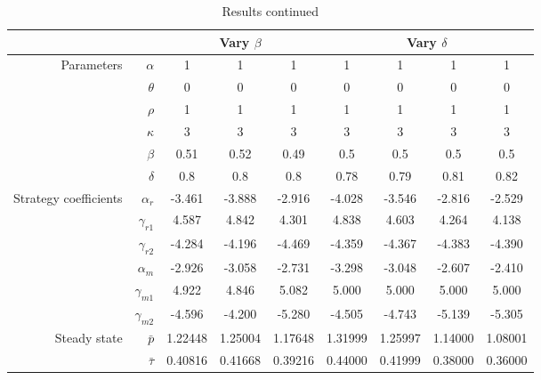 \begin{sidewaystable}[htbp]
  \centering
  \caption{Results continued}
    \begin{tabular}{|rr|ccc|cccc|}
    \hline
          &       & \multicolumn{3}{c|}{Vary $\beta$}   & \multicolumn{4}{c|}{Vary $\delta$}  \\
    \hline
    \multirow{6}[1]{*}{Parameters} & $\alpha$ & 1     & 1     & 1     & 1     & 1     & 1     & 1\\
          & $\theta$ & 0     & 0     & 0     & 0     & 0     & 0     & 0 \\
          & $\rho$ & 1     & 1     & 1     & 1     & 1     & 1     & 1 \\
          & $\kappa$ & 3     & 3     & 3     & 3     & 3     & 3     & 3 \\
          & $\beta$ & 0.51  & 0.52  & 0.49  & 0.5   & 0.5   & 0.5   & 0.5 \\
          & $\delta$ & 0.8   & 0.8   & 0.8   & 0.78  & 0.79  & 0.81  & 0.82 \\ \hline
    \multirow{6}[0]{*}{Strategy coefficients} & $\alpha_r$ & -3.461 & -3.888 & -2.916 & -4.028 & -3.546 & -2.816 & -2.529 \\
          & $\gamma_{r1}$ & 4.587 & 4.842 & 4.301 & 4.838 & 4.603 & 4.264 & 4.138 \\
          & $\gamma_{r2}$ & -4.284 & -4.196 & -4.469 & -4.359 & -4.367 & -4.383 & -4.390 \\
          & $\alpha_m$ & -2.926 & -3.058 & -2.731 & -3.298 & -3.048 & -2.607 & -2.410 \\
          & $\gamma_{m1}$ & 4.922 & 4.846 & 5.082 & 5.000 & 5.000 & 5.000 & 5.000 \\
          & $\gamma_{m2}$ & -4.596 & -4.200 & -5.280 & -4.505 & -4.743 & -5.139 & -5.305 \\ \hline
    \multirow{2}[1]{*}{Steady state} & $\bar{p}$ & 1.22448 & 1.25004 & 1.17648 & 1.31999 & 1.25997 & 1.14000 & 1.08001 \\
          & $\bar{\tau}$ & 0.40816 & 0.41668 & 0.39216 & 0.44000 & 0.41999 & 0.38000 & 0.36000\\
    \hline
    \end{tabular}
\label{tab:numres2}
\end{sidewaystable}

